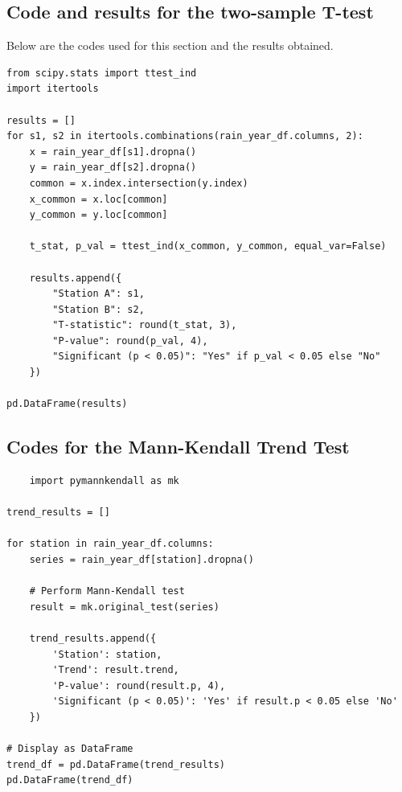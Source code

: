 \documentclass[12pt]{article}
\theoremstyle{definition}
\begin{document}
\subsection{Code and results for the two-sample T-test}
Below are the codes used for this section and the results obtained.
\begin{verbatim}
from scipy.stats import ttest_ind
import itertools

results = []
for s1, s2 in itertools.combinations(rain_year_df.columns, 2):
    x = rain_year_df[s1].dropna()
    y = rain_year_df[s2].dropna()
    common = x.index.intersection(y.index)
    x_common = x.loc[common]
    y_common = y.loc[common]
    
    t_stat, p_val = ttest_ind(x_common, y_common, equal_var=False)
    
    results.append({
        "Station A": s1,
        "Station B": s2,
        "T-statistic": round(t_stat, 3),
        "P-value": round(p_val, 4),
        "Significant (p < 0.05)": "Yes" if p_val < 0.05 else "No"
    })

pd.DataFrame(results)

\end{verbatim}
\subsection{Codes for the Mann-Kendall Trend Test}
\begin{verbatim}
    import pymannkendall as mk

trend_results = []

for station in rain_year_df.columns:
    series = rain_year_df[station].dropna()
    
    # Perform Mann-Kendall test
    result = mk.original_test(series)
    
    trend_results.append({
        'Station': station,
        'Trend': result.trend,
        'P-value': round(result.p, 4),
        'Significant (p < 0.05)': 'Yes' if result.p < 0.05 else 'No'
    })

# Display as DataFrame
trend_df = pd.DataFrame(trend_results)
pd.DataFrame(trend_df)
\end{verbatim}
\end{document}

